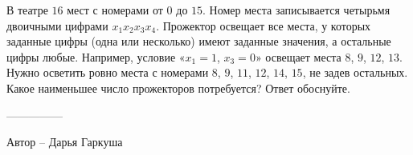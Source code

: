 \question
В театре $16$ мест с номерами от $0$ до $15$. Номер места записывается четырьмя двоичными цифрами $x_1x_2x_3x_4$. Прожектор освещает все места, у которых заданные цифры (одна или несколько) имеют заданные значения, а остальные цифры любые. Например, условие «$x_1=1$, $x_3=0$» освещает места $8$, $9$, $12$, $13$. Нужно осветить ровно места с номерами $8$, $9$, $11$, $12$, $14$, $15$, не задев остальных. Какое наименьшее число прожекторов потребуется? Ответ обоснуйте.

---------------

Автор -- Дарья Гаркуша